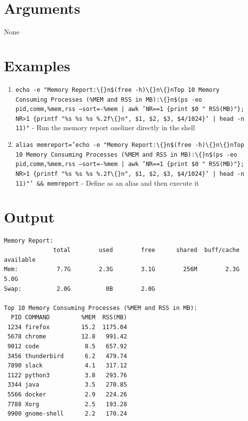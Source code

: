 \documentclass{article}
\begin{document}
\section*{Arguments}
None

\section*{Examples}
\begin{enumerate}
  \item \texttt{echo -e "Memory Report:\textbackslash\{\}n\$(free -h)\textbackslash\{\}n\textbackslash\{\}nTop 10 Memory Consuming Processes (\%MEM and RSS in MB):\textbackslash\{\}n\$(ps -eo pid,comm,\%mem,rss --sort=-\%mem | awk 'NR==1 \{print \$0 " RSS(MB)"\}; NR>1 \{printf "\%s \%s \%s \%.2f\textbackslash\{\}n", \$1, \$2, \$3, \$4/1024\}' | head -n 11)"} - Run the memory report oneliner directly in the shell
  \item \texttt{alias memreport='echo -e "Memory Report:\textbackslash\{\}n\$(free -h)\textbackslash\{\}n\textbackslash\{\}nTop 10 Memory Consuming Processes (\%MEM and RSS in MB):\textbackslash\{\}n\$(ps -eo pid,comm,\%mem,rss --sort=-\%mem | awk 'NR==1 \{print \$0 " RSS(MB)"\}; NR>1 \{printf "\%s \%s \%s \%.2f\textbackslash\{\}n", \$1, \$2, \$3, \$4/1024\}' | head -n 11)"' \&\& memreport} - Define as an alias and then execute it
\end{enumerate}

\section*{Output}
\begin{lstlisting}
Memory Report:
              total        used        free      shared  buff/cache   available
Mem:           7.7G        2.3G        3.1G        256M        2.3G        5.0G
Swap:          2.0G          0B        2.0G

Top 10 Memory Consuming Processes (%MEM and RSS in MB):
  PID COMMAND         %MEM  RSS(MB)
 1234 firefox         15.2  1175.04
 5678 chrome          12.8   991.42
 9012 code             8.5   657.92
 3456 thunderbird      6.2   479.74
 7890 slack            4.1   317.12
 1122 python3          3.8   293.76
 3344 java             3.5   270.85
 5566 docker           2.9   224.26
 7788 Xorg             2.5   193.28
 9900 gnome-shell      2.2   170.24
\end{lstlisting}
\end{document}
